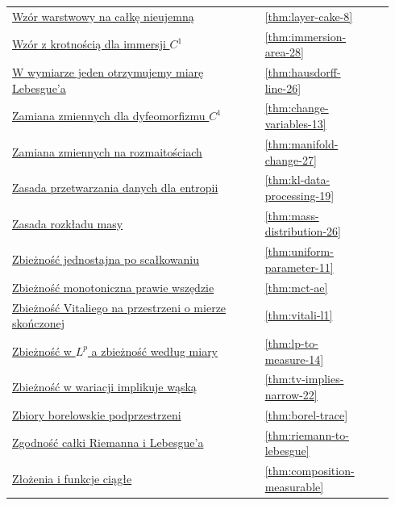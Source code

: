 \documentclass[11pt,a4paper,oneside]{book}
\numberwithin{equation}{chapter}
\theoremstyle{plain}
\theoremstyle{definition}
\theoremstyle{remark}
\begin{document}
\begin{longtable}{@{}p{0.72\linewidth}p{0.135\linewidth}p{0.08\linewidth}@{}}
\hyperref[thm:layer-cake-8]{Wzór warstwowy na całkę nieujemną} & \ref*{thm:layer-cake-8} & \pageref*{thm:layer-cake-8} \\
\hyperref[thm:immersion-area-28]{Wzór z krotnością dla immersji $C^1$} & \ref*{thm:immersion-area-28} & \pageref*{thm:immersion-area-28} \\
\hyperref[thm:hausdorff-line-26]{W wymiarze jeden otrzymujemy miarę Lebesgue'a} & \ref*{thm:hausdorff-line-26} & \pageref*{thm:hausdorff-line-26} \\
\hyperref[thm:change-variables-13]{Zamiana zmiennych dla dyfeomorfizmu $C^1$} & \ref*{thm:change-variables-13} & \pageref*{thm:change-variables-13} \\
\hyperref[thm:manifold-change-27]{Zamiana zmiennych na rozmaitościach} & \ref*{thm:manifold-change-27} & \pageref*{thm:manifold-change-27} \\
\hyperref[thm:kl-data-processing-19]{Zasada przetwarzania danych dla entropii} & \ref*{thm:kl-data-processing-19} & \pageref*{thm:kl-data-processing-19} \\
\hyperref[thm:mass-distribution-26]{Zasada rozkładu masy} & \ref*{thm:mass-distribution-26} & \pageref*{thm:mass-distribution-26} \\
\hyperref[thm:uniform-parameter-11]{Zbieżność jednostajna po scałkowaniu} & \ref*{thm:uniform-parameter-11} & \pageref*{thm:uniform-parameter-11} \\
\hyperref[thm:mct-ae]{Zbieżność monotoniczna prawie wszędzie} & \ref*{thm:mct-ae} & \pageref*{thm:mct-ae} \\
\hyperref[thm:vitali-l1]{Zbieżność Vitaliego na przestrzeni o mierze skończonej} & \ref*{thm:vitali-l1} & \pageref*{thm:vitali-l1} \\
\hyperref[thm:lp-to-measure-14]{Zbieżność w $L^p$ a zbieżność według miary} & \ref*{thm:lp-to-measure-14} & \pageref*{thm:lp-to-measure-14} \\
\hyperref[thm:tv-implies-narrow-22]{Zbieżność w wariacji implikuje wąską} & \ref*{thm:tv-implies-narrow-22} & \pageref*{thm:tv-implies-narrow-22} \\
\hyperref[thm:borel-trace]{Zbiory borelowskie podprzestrzeni} & \ref*{thm:borel-trace} & \pageref*{thm:borel-trace} \\
\hyperref[thm:riemann-to-lebesgue]{Zgodność całki Riemanna i Lebesgue'a} & \ref*{thm:riemann-to-lebesgue} & \pageref*{thm:riemann-to-lebesgue} \\
\hyperref[thm:composition-measurable]{Złożenia i funkcje ciągłe} & \ref*{thm:composition-measurable} & \pageref*{thm:composition-measurable} \\

\end{longtable}
\end{document}
